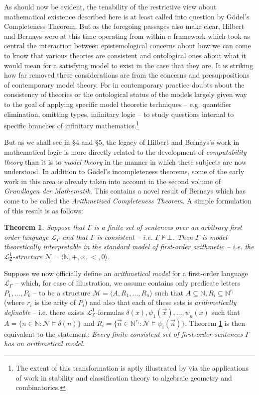 \documentclass[11pt,fleqn,leqno]{article}
\newtheorem{theorem}{Theorem}[section]
\def\proves{\vdash}
\begin{document}
As should now be evident, the tenability of the restrictive view about mathematical existence described here is at least called into question by G\"odel's Completeness Theorem. But as the foregoing passages also make clear, Hilbert and Bernays were at this time operating from within a framework which took as central the interaction between epistemological concerns about how we can come to know that various theories are consistent and ontological ones about what it would mean for a satisfying model to exist in the case that they are.  It is striking how far removed these considerations are from the concerns and presuppositions of contemporary model theory.  For in contemporary practice doubts about the consistency of theories or the ontological status of the models largely given way to the goal of applying specific model theoretic techniques  -- e.g. quantifier elimination, omitting types, infinitary logic -- to study questions internal to specific branches of infinitary mathematics.\footnote{The extent of this transformation is aptly illustrated by \citet{Baldwin2018} via the applications of work in stability and classification theory to algebraic geometry and combinatorics.}

But as we shall see in \S 4 and \S 5, the legacy of Hilbert and Bernays's work in mathematical logic is more directly related to the development of \textsl{computability theory} than it is to \textsl{model theory} in the manner in which these subjects are now understood.   In addition to G\"odel's incompleteness theorems, some of the early work in this area is already taken into account in the second volume of \textsl{Grundlagen der Mathematik}.  This contains a novel result of Bernays which has come to be called the \textsl{Arithmetized Completeness Theorem}.    A simple formulation of this result is as follows:
\begin{theorem}
\label{act}
Suppose that $\Gamma$ is a finite set of sentences over an arbitrary first order language $\mathcal{L}_{\Gamma}$ and that $\Gamma$ is consistent -- i.e. $\Gamma \not\proves \bot$.   Then $\Gamma$ is model-theoretically interpretable in the standard model of first-order arithmetic -- i.e. the $\mathcal{L}^1_{\mathsf{Z}}$-structure $\mathcal{N} = \langle \mathbb{N},+,\times,<,0\rangle$.   
\end{theorem}
\noindent Suppose we now officially define an \textsl{arithmetical model} for a first-order language $\mathcal{L}_{\Gamma}$ -- which, for ease of illustration, we assume contains only predicate letters $P_1,\ldots,P_k$ -- to be a structure $\mathcal{M} = \langle A,R_1,\ldots,R_n \rangle$ such that $A \subseteq \mathbb{N}, R_i \subseteq \mathbb{N}^{r_i}$ (where $r_i$ is the arity of $P_i$) and also that each of these sets is \textsl{arithmetically definable} -- i.e. there exists $\mathcal{L}^1_{\mathsf{Z}}$-formulas $\delta(x),\psi_1(\vec{x}), \ldots, \psi_n(x)$ such that $A = \{n \in \mathbb{N} : \mathcal{N} \models \delta(n)\}$ and $R_i = \{\vec{n} \in \mathbb{N}^{r_i} : \mathcal{N} \models \psi_i(\vec{n})\}$.  Theorem \ref{act} is then equivalent to the statement: \textsl{Every finite consistent set of first-order sentences $\Gamma$ has an arithmetical model}.  
\end{document}
